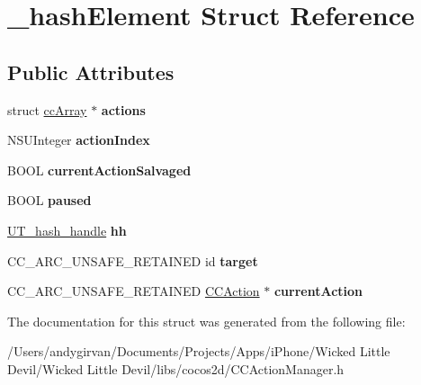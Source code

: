 \hypertarget{struct__hash_element}{\section{\-\_\-hash\-Element Struct Reference}
\label{struct__hash_element}
}
\subsection*{Public Attributes}
\begin{DoxyCompactItemize}
\item 
\hypertarget{struct__hash_element_aa29504e6bd43f1b78581d535ee28bb7f}{struct \hyperlink{structcc_array}{cc\-Array} $\ast$ {\bfseries actions}}\label{struct__hash_element_aa29504e6bd43f1b78581d535ee28bb7f}

\item 
\hypertarget{struct__hash_element_a539b7ce4e22be6e78afdc88986f4aad6}{N\-S\-U\-Integer {\bfseries action\-Index}}\label{struct__hash_element_a539b7ce4e22be6e78afdc88986f4aad6}

\item 
\hypertarget{struct__hash_element_ab5ee5744445fc96648318cd20e4907ac}{B\-O\-O\-L {\bfseries current\-Action\-Salvaged}}\label{struct__hash_element_ab5ee5744445fc96648318cd20e4907ac}

\item 
\hypertarget{struct__hash_element_a90c11df9075d30d6f1ffd67b27019313}{B\-O\-O\-L {\bfseries paused}}\label{struct__hash_element_a90c11df9075d30d6f1ffd67b27019313}

\item 
\hypertarget{struct__hash_element_a478c5e7c62426f22612799d32ee2234f}{\hyperlink{struct_u_t__hash__handle}{U\-T\-\_\-hash\-\_\-handle} {\bfseries hh}}\label{struct__hash_element_a478c5e7c62426f22612799d32ee2234f}

\item 
\hypertarget{struct__hash_element_a26c51f054b066e23b1b82e5bf1978406}{C\-C\-\_\-\-A\-R\-C\-\_\-\-U\-N\-S\-A\-F\-E\-\_\-\-R\-E\-T\-A\-I\-N\-E\-D id {\bfseries target}}\label{struct__hash_element_a26c51f054b066e23b1b82e5bf1978406}

\item 
\hypertarget{struct__hash_element_adcde4b71e1d011b2539ced5f7560d2c1}{C\-C\-\_\-\-A\-R\-C\-\_\-\-U\-N\-S\-A\-F\-E\-\_\-\-R\-E\-T\-A\-I\-N\-E\-D \hyperlink{interface_c_c_action}{C\-C\-Action} $\ast$ {\bfseries current\-Action}}\label{struct__hash_element_adcde4b71e1d011b2539ced5f7560d2c1}

\end{DoxyCompactItemize}


The documentation for this struct was generated from the following file\-:\begin{DoxyCompactItemize}
\item 
/\-Users/andygirvan/\-Documents/\-Projects/\-Apps/i\-Phone/\-Wicked Little Devil/\-Wicked Little Devil/libs/cocos2d/C\-C\-Action\-Manager.\-h\end{DoxyCompactItemize}

